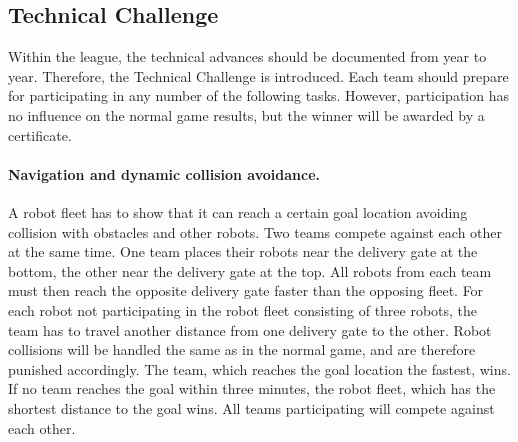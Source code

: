 \documentclass[12pt,twoside]{article}
\begin{document}
\subsection{Technical Challenge}
\label{sec:technical-challenge}
Within the league, the technical advances should be documented from
year to year. Therefore, the Technical Challenge is introduced. Each
team should prepare for participating in any number of the following
tasks. However, participation has no influence on the normal game
results, but the winner will be awarded by a certificate.


\paragraph{Navigation and dynamic collision avoidance.~}
A robot fleet has to show that it can reach a certain goal location
avoiding collision with obstacles and other robots. Two teams compete
against each other at the same time. One team places their robots near
the delivery gate at the bottom, the other near the delivery gate at
the top. All robots from each team must then reach the opposite
delivery gate faster than the opposing fleet. For each robot not
participating in the robot fleet consisting of three robots, the team
has to travel another distance from one delivery gate to the
other. Robot collisions will be handled the same as in the normal
game, and are therefore punished accordingly. The team, which reaches
the goal location the fastest, wins. If no team reaches the goal
within three minutes, the robot fleet, which has the shortest distance
to the goal wins. All teams participating will compete against each
other.

\end{document}
